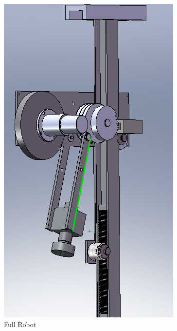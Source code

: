 \begin{frame}
\begin{columns}
\begin{figure}
\centering
\includegraphics[scale = 0.4]{fig/hopper_bot.png}
\caption{Full Robot}
\end{figure}
\end{columns}
\end{frame}


